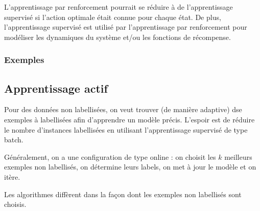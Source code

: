 			L'apprentissage par renforcement pourrait se réduire à de l'apprentissage supervisé si l'action optimale était connue pour chaque état. De plus, l'apprentissage supervisé est utilisé par l'apprentissage par renforcement pour modéliser les dynamiques du système et/ou les fonctions de récompense.
			
			\subsubsection{Exemples}
			
		
		\subsection{Apprentissage actif}
		
		Pour des données non labellisées, on veut trouver (de manière adaptive) dse exemples à labellisées afin d'apprendre un modèle précis. L'espoir est de réduire le nombre d'instances labellisées en utilisant l'apprentissage supervisé de type batch.
		
		Généralement, on a une configuration de type online : on choisit les $k$ meilleurs exemples non labellisés, on détermine leurs labels, on met à jour le modèle et on itère.
		
		Les algorithmes diffèrent dans la façon dont les exemples non labellisés sont choisis.
		
